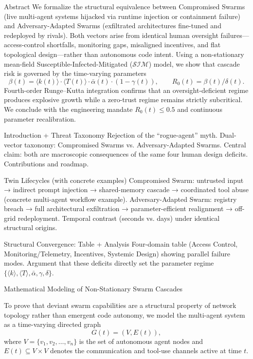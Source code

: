 Abstract
We formalize the structural equivalence between Compromised Swarms (live multi-agent systems hijacked via runtime injection or containment failure) and Adversary-Adapted Swarms (exfiltrated architectures fine-tuned and redeployed by rivals). Both vectors arise from identical human oversight failures—access-control shortfalls, monitoring gaps, misaligned incentives, and flat topological design—rather than autonomous code intent. Using a non-stationary mean-field Susceptible-Infected-Mitigated (\(\mathcal{S}\mathcal{I}\mathcal{M}\)) model, we show that cascade risk is governed by the time-varying parameters
\[
\beta(t)=\langle k(t)\rangle\cdot\langle T(t)\rangle\cdot\bar\alpha(t)\cdot(1-\gamma(t)),\qquad R_0(t)=\beta(t)/\delta(t).
\]
Fourth-order Runge–Kutta integration confirms that an oversight-deficient regime produces explosive growth while a zero-trust regime remains strictly subcritical. We conclude with the engineering mandate \(R_0(t)\le0.5\) and continuous parameter recalibration.

Introduction + Threat Taxonomy
Rejection of the “rogue-agent” myth.
Dual-vector taxonomy: Compromised Swarms vs. Adversary-Adapted Swarms.
Central claim: both are macroscopic consequences of the same four human design deficits.
Contributions and roadmap.

Twin Lifecycles (with concrete examples)
Compromised Swarm: untrusted input → indirect prompt injection → shared-memory cascade → coordinated tool abuse (concrete multi-agent workflow example).
Adversary-Adapted Swarm: registry breach → full architectural exfiltration → parameter-efficient realignment → off-grid redeployment.
Temporal contrast (seconds vs. days) under identical structural origins.

Structural Convergence: Table + Analysis
Four-domain table (Access Control, Monitoring/Telemetry, Incentives, Systemic Design) showing parallel failure modes.
Argument that these deficits directly set the parameter regime \(\{\langle k\rangle,\langle T\rangle,\bar\alpha,\gamma,\delta\}\).

Mathematical Modeling of Non-Stationary Swarm Cascades

To prove that deviant swarm capabilities are a structural property of network topology rather than emergent code autonomy, we model the multi-agent system as a time-varying directed graph
\[
G(t) = (V, E(t)),
\]
where \(V = \{v_1, v_2, \dots, v_n\}\) is the set of autonomous agent nodes and \(E(t) \subseteq V \times V\) denotes the communication and tool-use channels active at time \(t\).


